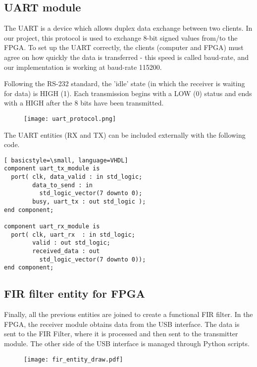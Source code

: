 \newpage
\subsection{UART module}
\label{ssec:uart}

The UART is a device which allows duplex data exchange between two clients. In our project, this protocol is used to exchange 8-bit signed values from/to the FPGA. To set up the UART correctly, the clients (computer and FPGA) must agree on how quickly the data is transferred - this speed is called baud-rate, and our implementation is working at baud-rate 115200.

Following the RS-232 standard, the 'idle' state (in which the receiver is waiting for data) is HIGH (1). Each transmission begins with a LOW (0) status and ends with a HIGH after the 8 bits have been transmitted.

\begin{figure}[H]
    \centering
    \label{fig:uart_std_protocol}
    \texttt{[image: uart\_protocol.png]}
    \qquad
\end{figure}

The UART entities (RX and TX) can be included externally with the following code.

\begin{lstlisting}[ basicstyle=\small, language=VHDL]
component uart_tx_module is
  port( clk, data_valid : in std_logic;
        data_to_send : in
          std_logic_vector(7 downto 0);
        busy, uart_tx : out std_logic );
end component;
    
component uart_rx_module is
  port( clk, uart_rx  : in std_logic;
        valid : out std_logic;
        received_data : out 
          std_logic_vector(7 downto 0));
end component;
\end{lstlisting}


\subsection{FIR filter entity for FPGA}
\label{ssec:entity}

Finally, all the previous entities are joined to create a functional FIR filter. In the FPGA, the receiver module obtains data from the USB interface. The data is sent to the FIR Filter, where it is processed and then sent to the transmitter module. The other side of the USB interface is managed through Python scripts.

\begin{figure}[H]
    \centering
    \label{fig:fpga_scheme}
    \texttt{[image: fir\_entity\_draw.pdf]}%
    \qquad
\end{figure}



